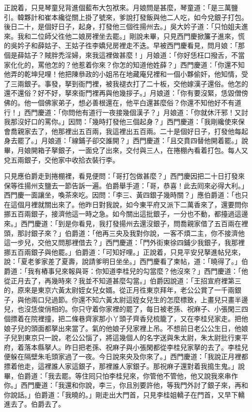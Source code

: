 正說着，只見琴童兒背進個藍布大包袱來。月娘問是甚麼，琴童道：「是三萬鹽引。韓夥計和崔本纔從關上掛了號來，爹說打發飯與他二人吃，如今兌銀子打包。後日二十，是個好日子，起身，打發他三個徃揚州去。」吳大妗子道：「只怕姐夫進來。我和二位師父徃他二娘房裡坐去罷。」剛說未畢，只見西門慶掀簾子進來，慌的吳妗子和薛姑子、王姑子徃李嬌兒房裡走不迭。早被西門慶看見，問月娘：「那個是薛姑子？賊胖禿淫婦，來我這裡做甚麼！」月娘道：「你好恁枉口撥舌，不當家化化的，罵他怎的？他惹着你來？你怎的知道他姓薛？」西門慶道：「你還不知他弄的乾坤兒哩！他把陳叅政的小姐吊在地藏庵兒裡和一個小夥偷奸，他知情，受了三兩銀子。事發，拏到衙門裡，被我褪衣打了二十板，交他嫁漢子還俗。他怎的還不還俗？好不好，拏來衙門裡再與他幾拶子。」月娘道：「你有要沒緊，恁毀僧傍佛的。他一個佛家弟子，想必善根還在，他平白還甚麼俗？你還不知他好不有道行！」{}西門慶道：「你問他有道行一夜接幾個漢子？」月娘道：「你就休汗邪！又討我那沒好口的罵你。」{}因問：「幾時打發他三個起身？」西門慶道：「我剛纔使來保會喬親家去了，他那裡出五百兩，我這裡出五百兩。二十是個好日子，打發他每起身去罷了。」月娘道：「線鋪子卻交誰開？」西門慶道：「且交賁四替他開着罷。」說畢，月娘開箱子拏銀子，一面兌了出來，交付與三人，在捲棚內看着打包。每人又兌五兩銀子，交他家中收拾衣裝行李。

只見應伯爵走到捲棚裡，看見便問：「哥打包做甚麼？」西門慶因把二十日打發來保等徃揚州支鹽去一節告訴一遍。伯爵舉手道：「哥，恭喜！此去囘來必得大利。」西門慶一面讓坐，喚茶來吃。因問：「李三、黃四銀子幾時關？」應伯爵道：「也只在這個月裡就關出來了。他昨日對我說，如今東平府又派下二萬香來了，還要問你挪五百兩銀子，接濟他這一時之急。如今關出這批銀子，一分也不動，都擡過這邊來。」西門慶道：「到是你看見，我打發揚州去還沒銀子，問喬親家借了五百兩在裡頭，那討銀子來？」伯爵道：「他再三央及我對你說，一客不煩二主，你不接濟他這一步兒，交他又問那裡借去？」西門慶道：「門外街東徐四鋪少我銀子，我那裡挪五百兩銀子與他罷。」伯爵道：「可知好哩。」正說着，只見平安兒拏進帖兒來，說：「夏老爹家差了夏壽，說請爹明日坐坐。」西門慶看了柬帖，道：「曉得了。」伯爵道：「我有樁事兒來報與哥：你知道李桂兒的勾當麼？他沒來？」西門慶道：「他從正月去了，再幾時來？我並不知道甚麼勾當。」伯爵因說道：「王招宣府裡第三的，原來是東京六黃太尉姪女兒女婿。從正月徃東京拜年，老公公賞了一千兩銀子，與他兩口兒過節。你還不知六黃太尉這姪女兒生的怎麼標致，上畫兒只畫半邊兒，也沒恁俊俏相的。你只守着你家裡的罷了，每日被老孫、祝麻子、小張閑三四個摽着在院裡撞，把二條巷齊家那小丫頭子齊香兒梳籠了，又在李桂兒家走。把他娘子兒的頭面都拏出來當了。氣的他娘子兒家裡上吊。不想前日老公公生日，他娘子兒到東京只一說，老公公惱了，將這幾個人的名字送與朱太尉，朱太尉批行東平府，着落本縣拏人。昨日把老孫、祝麻子與小張閑都從李桂兒家拏的去了。李桂兒便躲在隔壁朱毛頭家過了一夜。今日說來央及你來了。」西門慶道：「我說正月裡都摽着他走，這裡誰人家這銀子，那裡誰人家銀子。那祝麻子還對着我搗生鬼。」說畢，伯爵道：「我去罷。等住囘只怕李桂兒來，你管他不管他，他又說我來串作你。」西門慶道：「我還和你說，李三，你且別要許他，等我門外討了銀子來，再和你說話。」伯爵道：「我曉的。」剛走出大門首，只見李桂姐轎子在門首，又早下轎進去了。伯爵去了。

